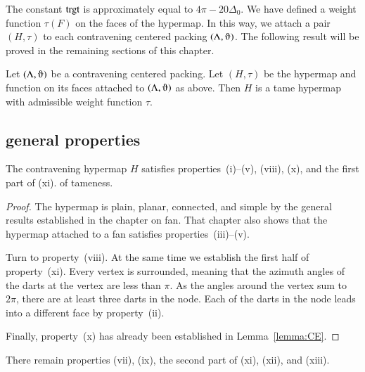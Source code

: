 The constant ${\operatorname{trgt}}$ is approximately equal to $4\pi - 20\Delta_0$.
We have defined a weight function $\tau(F)$ on the faces of the hypermap.  In this way, we attach a pair $(H,\tau)$ to each contravening centered packing $(\Lambda,\orgn)$.  The following result will be proved in the remaining sections of this chapter.


\begin{theorem} \label{theorem:contravene}
Let $(\Lambda,\orgn)$ be a contravening centered packing.  Let $(H,\tau)$ be
the hypermap and function on its faces attached to $(\Lambda,\orgn)$ as above.
Then $H$ is a tame hypermap with admissible weight function $\tau$.
\end{theorem}




\subsection{general properties}
    \label{sec:startame}



\begin{lemma} %
The contravening hypermap $H$ satisfies properties~(i)--(v),  %
(viii),  (x), and the first part of (xi).
of tameness.
\end{lemma}

\begin{proof}
The hypermap is plain, planar, connected, and simple by the general results established in the chapter on fan.  That chapter also shows that the hypermap attached to a fan satisfies properties~(iii)--(v).  

Turn to property~(viii). At the same time we establish the first half of property~(xi).  Every vertex is surrounded, meaning that the azimuth angles of the darts at the vertex are less than $\pi$.  As the angles around the vertex sum to $2\pi$, there are at least three darts in the node. Each of the darts in the node leads into a different face by property~(ii).

Finally, property~(x) has already been established in Lemma~\ref{lemma:CE}.
\end{proof}

There remain properties (vii), (ix), the second part of (xi), (xii), and (xiii).








